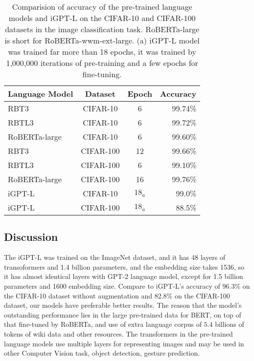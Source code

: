 \documentclass[review]{cvpr}
\begin{document}
\begin{table}
\begin{center}
\begin{tabular}{|l|c|c|r|}
\hline
Language Model 	& Dataset & Epoch & Accuracy \\
\hline\hline
RBT3   & CIFAR-10 & 6	&	99.74\% \\
RBTL3  & CIFAR-10 & 6	&	99.72\% \\
RoBERTa-large  & CIFAR-10 & 6	&	99.60\% \\
\hline
RBT3   & CIFAR-100 & 12	&	99.66\% \\
RBTL3  & CIFAR-100 & 6  & 	99.10\% \\
RoBERTa-large & CIFAR-100 & 16 &	99.76\% \\
\hline\hline
iGPT-L & CIFAR-10 & $18_a$ & 99.0\%\\
iGPT-L & CIFAR-100 & $18_a$ & 88.5\%\\
\hline
\end{tabular}
\end{center}
\caption{Comparision of accuracy of the pre-trained language models and iGPT-L on the CIFAR-10 and CIFAR-100 datasets in the image classification task.
RoBERTa-large is short for RoBERTa-wwm-ext-large. (a) iGPT-L model was trained far more than 18 epochs, it was trained by 1,000,000 iterations of pre-training and a few epochs for fine-tuning.}
\end{table}


\subsection{Discussion}

The iGPT-L was trained on the ImageNet dataset, and it has 48 layers of transoformers and 1.4 billion parameters, and the embedding size takes 1536,
so it has almost identical layers with GPT-2 language model, except for 1.5 billion parameters and 1600 embedding size.
Compare to iGPT-L's accuracy of 96.3\% on the CIFAR-10 dataset without augmentation and 82.8\% on the CIFAR-100 dataset, our models have preferable better results.
The reason that the model's outstanding performance lies in the large pre-trained data for BERT, on top of that fine-tuned by RoBERTa, and use of extra language corpus of
$5.4$ billions of tokens of wiki data and other resources.
The transformers in the pre-trained language models use multiple layers for representing images and may be used in other Computer Vision task, \eg object detection, gesture prediction.
\end{document}
